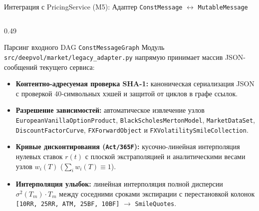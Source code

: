 \documentclass[aspectratio=169, 9pt]{beamer}
\begin{document}
\begin{frame}{Интеграция с PricingService (M5): Адаптер \texttt{ConstMessage} $\leftrightarrow$ \texttt{MutableMessage}}
  \begin{columns}[T]
    \begin{column}{0.49\textwidth}
      \begin{block}{Парсинг входного DAG \texttt{ConstMessageGraph}}
        Модуль \texttt{src/deepvol/market/legacy\_adapter.py} напрямую принимает массив JSON-сообщений текущего сервиса:
        \begin{itemize}
          \item \textbf{Контентно-адресуемая проверка SHA-1:} каноническая сериализация JSON с проверкой 40-символьных хэшей и защитой от циклов в графе ссылок.
          \item \textbf{Разрешение зависимостей:} автоматическое извлечение узлов \texttt{EuropeanVanillaOptionProduct}, \texttt{BlackScholesMertonModel}, \texttt{MarketDataSet}, \texttt{DiscountFactorCurve}, \texttt{FXForwardObject} и \texttt{FXVolatilitySmileCollection}.
          \item \textbf{Кривые дисконтирования (\texttt{Act/365F}):} кусочно-линейная интерполяция нулевых ставок $r(t)$ с плоской экстраполяцией и аналитическими весами узлов $w_i(T)$ ($\sum_i w_i(T) \equiv 1$).
          \item \textbf{Интерполяция улыбок:} линейная интерполяция полной дисперсии $\sigma^2(T_m)\cdot T_m$ между соседними сроками экспирации с перестановкой колонок \texttt{[10RR, 25RR, ATM, 25BF, 10BF]} $\to$ \texttt{SmileQuotes}.
        \end{itemize}
      \end{block}
    \end{column}


\end{columns}
\end{frame}
\end{document}
